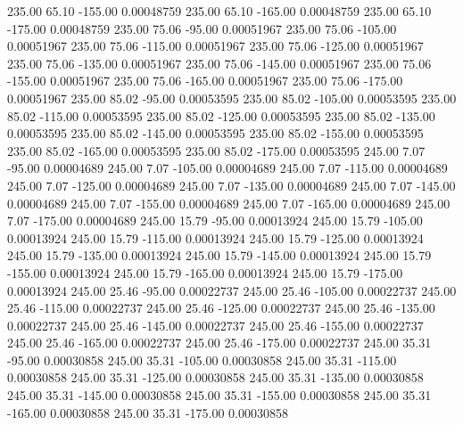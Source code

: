     235.00     65.10   -155.00     0.00048759
    235.00     65.10   -165.00     0.00048759
    235.00     65.10   -175.00     0.00048759
    235.00     75.06    -95.00     0.00051967
    235.00     75.06   -105.00     0.00051967
    235.00     75.06   -115.00     0.00051967
    235.00     75.06   -125.00     0.00051967
    235.00     75.06   -135.00     0.00051967
    235.00     75.06   -145.00     0.00051967
    235.00     75.06   -155.00     0.00051967
    235.00     75.06   -165.00     0.00051967
    235.00     75.06   -175.00     0.00051967
    235.00     85.02    -95.00     0.00053595
    235.00     85.02   -105.00     0.00053595
    235.00     85.02   -115.00     0.00053595
    235.00     85.02   -125.00     0.00053595
    235.00     85.02   -135.00     0.00053595
    235.00     85.02   -145.00     0.00053595
    235.00     85.02   -155.00     0.00053595
    235.00     85.02   -165.00     0.00053595
    235.00     85.02   -175.00     0.00053595
    245.00      7.07    -95.00     0.00004689
    245.00      7.07   -105.00     0.00004689
    245.00      7.07   -115.00     0.00004689
    245.00      7.07   -125.00     0.00004689
    245.00      7.07   -135.00     0.00004689
    245.00      7.07   -145.00     0.00004689
    245.00      7.07   -155.00     0.00004689
    245.00      7.07   -165.00     0.00004689
    245.00      7.07   -175.00     0.00004689
    245.00     15.79    -95.00     0.00013924
    245.00     15.79   -105.00     0.00013924
    245.00     15.79   -115.00     0.00013924
    245.00     15.79   -125.00     0.00013924
    245.00     15.79   -135.00     0.00013924
    245.00     15.79   -145.00     0.00013924
    245.00     15.79   -155.00     0.00013924
    245.00     15.79   -165.00     0.00013924
    245.00     15.79   -175.00     0.00013924
    245.00     25.46    -95.00     0.00022737
    245.00     25.46   -105.00     0.00022737
    245.00     25.46   -115.00     0.00022737
    245.00     25.46   -125.00     0.00022737
    245.00     25.46   -135.00     0.00022737
    245.00     25.46   -145.00     0.00022737
    245.00     25.46   -155.00     0.00022737
    245.00     25.46   -165.00     0.00022737
    245.00     25.46   -175.00     0.00022737
    245.00     35.31    -95.00     0.00030858
    245.00     35.31   -105.00     0.00030858
    245.00     35.31   -115.00     0.00030858
    245.00     35.31   -125.00     0.00030858
    245.00     35.31   -135.00     0.00030858
    245.00     35.31   -145.00     0.00030858
    245.00     35.31   -155.00     0.00030858
    245.00     35.31   -165.00     0.00030858
    245.00     35.31   -175.00     0.00030858

